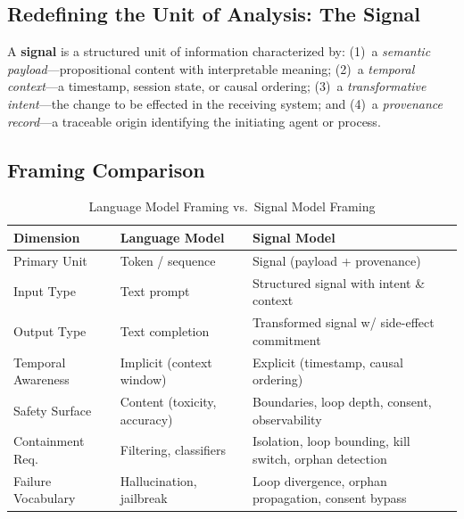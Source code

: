 \documentclass[11pt,a4paper]{article}
\begin{document}
\subsection{Redefining the Unit of Analysis: The Signal}

\begin{definitionbox}[title=Definition 2.1 --- Signal]
A \textbf{signal} is a structured unit of information characterized by:
(1)~a \emph{semantic payload}---propositional content with interpretable meaning;
(2)~a \emph{temporal context}---a timestamp, session state, or causal ordering;
(3)~a \emph{transformative intent}---the change to be effected in the receiving system; and
(4)~a \emph{provenance record}---a traceable origin identifying the initiating agent or process.
\end{definitionbox}

\subsection{Framing Comparison}

\begin{table}[htbp]
  \centering\small
  \caption{Language Model Framing vs.\ Signal Model Framing}
  \label{tab:framing}
  \begin{tabularx}{\linewidth}{L{2.8cm} L{4.5cm} L{5.5cm}}
    \toprule
    \textbf{Dimension} & \textbf{Language Model} & \textbf{Signal Model} \\
    \midrule
    Primary Unit       & Token / sequence          & Signal (payload + provenance) \\
    Input Type         & Text prompt               & Structured signal with intent \& context \\
    Output Type        & Text completion           & Transformed signal w/ side-effect commitment \\
    Temporal Awareness & Implicit (context window) & Explicit (timestamp, causal ordering) \\
    Safety Surface     & Content (toxicity, accuracy) & Boundaries, loop depth, consent, observability \\
    Containment Req.   & Filtering, classifiers    & Isolation, loop bounding, kill switch, orphan detection \\
    Failure Vocabulary & Hallucination, jailbreak  & Loop divergence, orphan propagation, consent bypass \\
    \bottomrule
  \end{tabularx}
\end{table}
\end{document}
